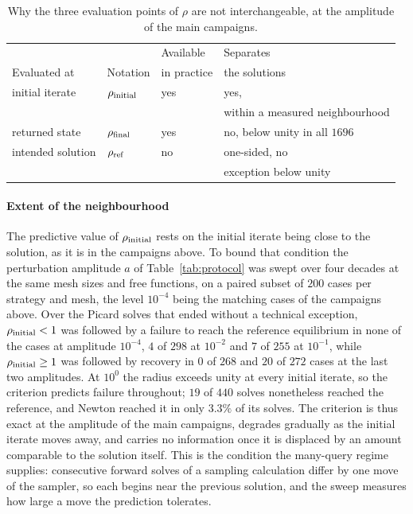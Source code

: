 \begin{table}[htb]
\centering
\caption{Why the three evaluation points of $\rho$ are not interchangeable, at the amplitude of the main campaigns.}
\label{tab:rho_variants}
\setlength{\tabcolsep}{7pt}
\begin{tabular}{llll}
\toprule
\rowcolor{gray!12}
 & & Available & Separates \\
\rowcolor{gray!12}
Evaluated at & Notation & in practice & the solutions \\
\midrule
initial iterate & $\rho_{\rm initial}$ & yes & yes, \\ &&& within a measured neighbourhood \\
returned state & $\rho_{\rm final}$ & yes & no, below unity in all $1696$ \\
intended solution & $\rho_{\rm ref}$ & no & one-sided, no \\ &&& exception below unity \\
\bottomrule
\end{tabular}
\end{table}

\paragraph{Extent of the neighbourhood}
The predictive value of $\rho_{\rm initial}$ rests on the initial iterate being close to the solution, as it is in the campaigns above. To bound that condition the perturbation amplitude $a$ of Table~\ref{tab:protocol} was swept over four decades at the same mesh sizes and free functions, on a paired subset of $200$ cases per strategy and mesh, the level $10^{-4}$ being the matching cases of the campaigns above. Over the Picard solves that ended without a technical exception, $\rho_{\rm initial}<1$ was followed by a failure to reach the reference equilibrium in none of the cases at amplitude $10^{-4}$, $4$ of $298$ at $10^{-2}$ and $7$ of $255$ at $10^{-1}$, while $\rho_{\rm initial}\geq1$ was followed by recovery in $0$ of $268$ and $20$ of $272$ cases at the last two amplitudes. At $10^{0}$ the radius exceeds unity at every initial iterate, so the criterion predicts failure throughout; $19$ of $440$ solves nonetheless reached the reference, and Newton reached it in only $3.3\%$ of its solves. The criterion is thus exact at the amplitude of the main campaigns, degrades gradually as the initial iterate moves away, and carries no information once it is displaced by an amount comparable to the solution itself. This is the condition the many-query regime supplies: consecutive forward solves of a sampling calculation differ by one move of the sampler, so each begins near the previous solution, and the sweep measures how large a move the prediction tolerates.

